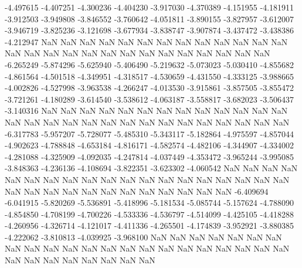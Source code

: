 -4.497615
-4.407251
-4.300236
-4.404230
-3.917030
-4.370389
-4.151955
-4.181911
-3.912503
-3.949808
-3.846552
-3.760642
-4.051811
-3.890155
-3.827957
-3.612007
-3.946719
-3.825236
-3.121698
-3.677934
-3.838747
-3.907874
-3.437472
-3.438386
-4.212947
NaN
NaN
NaN
NaN
NaN
NaN
NaN
NaN
NaN
NaN
NaN
NaN
NaN
NaN
NaN
NaN
NaN
NaN
NaN
NaN
NaN
NaN
NaN
NaN
NaN
NaN
NaN
-6.265249
-5.874296
-5.625940
-5.406490
-5.219632
-5.073023
-5.030410
-4.855682
-4.861564
-4.501518
-4.349951
-4.318517
-4.530659
-4.431550
-4.333125
-3.988665
-4.002826
-4.527998
-3.963538
-4.266247
-4.013530
-3.915861
-3.857505
-3.855472
-3.721261
-4.180289
-3.614540
-3.538612
-4.063187
-3.558817
-3.682023
-3.506437
-3.140316
NaN
NaN
NaN
NaN
NaN
NaN
NaN
NaN
NaN
NaN
NaN
NaN
NaN
NaN
NaN
NaN
NaN
NaN
NaN
NaN
NaN
NaN
NaN
NaN
NaN
NaN
NaN
NaN
-6.317783
-5.957207
-5.728077
-5.485310
-5.343117
-5.182864
-4.975597
-4.857044
-4.902623
-4.788848
-4.653184
-4.816171
-4.582574
-4.482106
-4.344907
-4.334002
-4.281088
-4.325909
-4.092035
-4.247814
-4.037449
-4.353472
-3.965244
-3.995085
-3.848363
-4.236136
-4.108694
-3.822351
-3.623302
-4.060542
NaN
NaN
NaN
NaN
NaN
NaN
NaN
NaN
NaN
NaN
NaN
NaN
NaN
NaN
NaN
NaN
NaN
NaN
NaN
NaN
NaN
NaN
NaN
NaN
NaN
NaN
NaN
NaN
NaN
NaN
NaN
-6.409694
-6.041915
-5.820269
-5.536891
-5.418996
-5.181534
-5.085744
-5.157624
-4.788090
-4.854850
-4.708199
-4.700226
-4.533336
-4.536797
-4.514099
-4.425105
-4.418288
-4.260956
-4.326714
-4.121017
-4.411336
-4.265501
-4.174839
-3.952921
-3.880385
-4.222062
-3.810813
-4.039925
-3.968100
NaN
NaN
NaN
NaN
NaN
NaN
NaN
NaN
NaN
NaN
NaN
NaN
NaN
NaN
NaN
NaN
NaN
NaN
NaN
NaN
NaN
NaN
NaN
NaN
NaN
NaN
NaN
NaN
NaN
NaN
